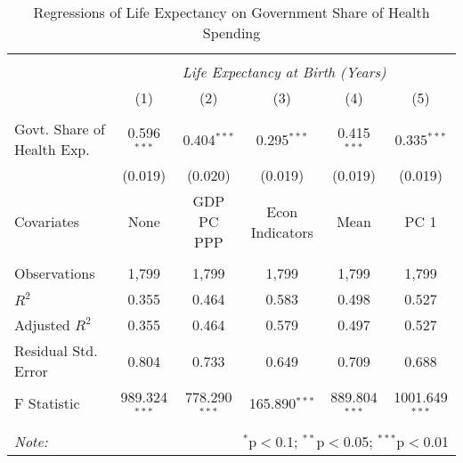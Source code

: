 \begin{table}[!htbp] \centering
  \caption{Regressions of Life Expectancy on Government Share of Health Spending \label{main_regs}}
\begin{tabular}{@{\extracolsep{5pt}}lccccc}
\\[-1.8ex]\hline
\hline \\[-1.8ex]
& \multicolumn{5}{c}{\textit{Life Expectancy at Birth (Years)}} \
\cr \
\\[-1.8ex] & (1) & (2) & (3) & (4) & (5) \\
\hline \\[-1.8ex]
 Govt. Share of Health Exp. & 0.596$^{***}$ & 0.404$^{***}$ & 0.295$^{***}$ & 0.415$^{***}$ & 0.335$^{***}$ \\
  & (0.019) & (0.020) & (0.019) & (0.019) & (0.019) \\
 Covariates & None & GDP PC PPP & Econ Indicators & Mean & PC 1 \\
\hline \\[-1.8ex]
 Observations & 1,799 & 1,799 & 1,799 & 1,799 & 1,799 \\
 $R^2$ & 0.355 & 0.464 & 0.583 & 0.498 & 0.527 \\
 Adjusted $R^2$ & 0.355 & 0.464 & 0.579 & 0.497 & 0.527 \\
 Residual Std. Error & 0.804 & 0.733 & 0.649 & 0.709 & 0.688  \\
 F Statistic & 989.324$^{***}$  & 778.290$^{***}$  & 165.890$^{***}$  & 889.804$^{***}$  & 1001.649$^{***}$  \\
\hline
\hline \\[-1.8ex]
\textit{Note:} & \multicolumn{5}{r}{$^{*}$p$<$0.1; $^{**}$p$<$0.05; $^{***}$p$<$0.01} \\
\end{tabular}
\end{table}